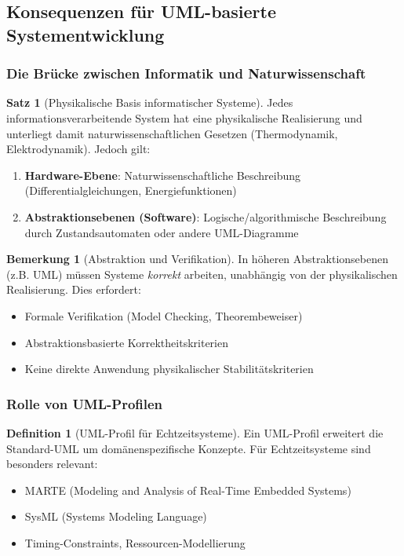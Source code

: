 ﻿\documentclass[a4paper,12pt]{scrreprt}
\theoremstyle{definition}
\newtheorem{definition}{Definition}[section]
\newtheorem{bemerkung}{Bemerkung}[section]
\newtheorem{satz}{Satz}[section]
\begin{document}
\subsection{Konsequenzen für UML-basierte Systementwicklung}

\subsubsection{Die Brücke zwischen Informatik und Naturwissenschaft}

\begin{satz}[Physikalische Basis informatischer Systeme]
	Jedes informationsverarbeitende System hat eine physikalische Realisierung und unterliegt damit naturwissenschaftlichen Gesetzen (Thermodynamik, Elektrodynamik). Jedoch gilt:
	\begin{enumerate}
		\item[-] \textbf{Hardware-Ebene}: Naturwissenschaftliche Beschreibung (Differentialgleichungen, Energiefunktionen)
		\item[-] \textbf{Abstraktionsebenen (Software)}: Logische/algorithmische Beschreibung durch Zu\-stands\-automaten oder andere UML-Diagramme
	\end{enumerate}
\end{satz}

\begin{bemerkung}[Abstraktion und Verifikation]
	In höheren Abstraktionsebenen (z.B. UML) müssen Systeme \textit{korrekt} arbeiten, unabhängig von der physikalischen Realisierung. Dies erfordert:
	\begin{itemize}
		\item[-] Formale Verifikation (Model Checking, Theorembeweiser)
		\item[-] Abstraktionsbasierte Korrektheitskriterien
		\item[-] Keine direkte Anwendung physikalischer Stabilitätskriterien
	\end{itemize}
\end{bemerkung}

\subsubsection{Rolle von UML-Profilen}

\begin{definition}[UML-Profil für Echtzeitsysteme]
	Ein UML-Profil erweitert die Standard-UML um domänenspezifische Konzepte. Für Echtzeitsysteme sind besonders relevant:
	\begin{itemize}
		\item[-] MARTE (Modeling and Analysis of Real-Time Embedded Systems)
		\item[-] SysML (Systems Modeling Language)
		\item[-] Timing-Constraints, Ressourcen-Modellierung
	\end{itemize}
\end{definition}
\end{document}
